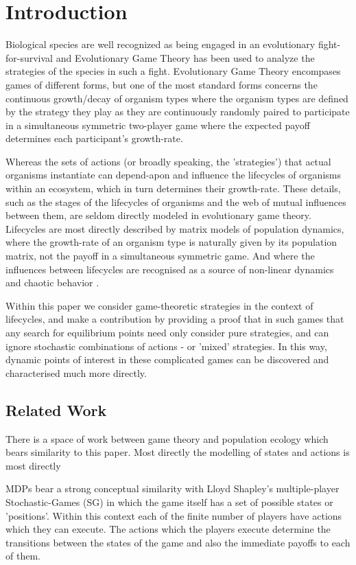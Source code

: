 
\section{Introduction}
Biological species are well recognized as being engaged in an evolutionary fight-for-survival and Evolutionary Game Theory has been used to analyze the strategies of the species in such a fight.
Evolutionary Game Theory encompases games of different forms, but one of the most standard forms concerns the continuous growth/decay of organism types where the organism types are defined by the strategy they play as they are continuously randomly paired to participate in a simultaneous symmetric two-player game where the expected payoff determines each participant's growth-rate.\cite{maynard,maynard2}

Whereas the sets of actions (or broadly speaking, the 'strategies') that actual organisms instantiate can depend-apon and influence the lifecycles of organisms within an ecosystem, which in turn determines their growth-rate.
These details, such as the stages of the lifecycles of organisms and the web of mutual influences between them, are seldom directly modeled in evolutionary game theory.
Lifecycles are most directly described by matrix models of population dynamics, where the growth-rate of an organism type is naturally given by its population matrix, not the payoff in a simultaneous symmetric game. And where the influences between lifecycles are recognised as a source of non-linear dynamics and chaotic behavior \cite{doi:10.1080/10236198.2019.1699916}\cite[Chapter 16,17]{population1}.

Within this paper we consider game-theoretic strategies in the context of lifecycles, and make a contribution by providing a proof that in such games that any search for equilibrium points need only consider pure strategies, and can ignore stochastic combinations of actions - or 'mixed' strategies.
In this way, dynamic points of interest in these complicated games can be discovered and characterised much more directly.

\subsection{Related Work}\label{sec:-1}

There is a space of work between game theory and population ecology which bears similarity to this paper.
Most directly the modelling of states and actions is most directly 

MDPs bear a strong conceptual similarity with Lloyd Shapley's multiple-player Stochastic-Games (SG) \cite{shapley53}\cite{Solan2015} in which the game itself has a set of possible states or 'positions'. Within this context each of the finite number of players have actions which they can execute. The actions which the players execute determine the transitions between the states of the game and also the immediate payoffs to each of them.

